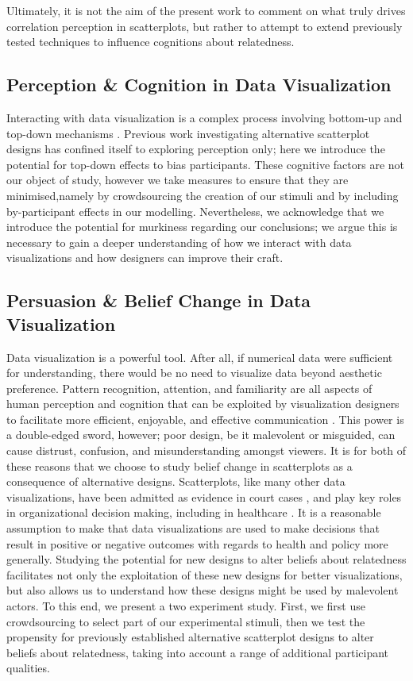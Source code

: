 \documentclass[manuscript,screen,review]{acmart}
\begin{document}
Ultimately, it is not the aim of the present work to comment on what
truly drives correlation perception in scatterplots, but rather to
attempt to extend previously tested techniques to influence cognitions
about relatedness.

\subsection{Perception \& Cognition in Data
Visualization}\label{sec-perception-cognition}

Interacting with data visualization is a complex process involving
bottom-up and top-down mechanisms
\citep{shah_2011, franconeri_2021, xiong_2022}. Previous work
investigating alternative scatterplot designs has confined itself to
exploring perception only; here we introduce the potential for top-down
effects to bias participants. These cognitive factors are not our object
of study, however we take measures to ensure that they are
minimised,namely by crowdsourcing the creation of our stimuli and by
including by-participant effects in our modelling. Nevertheless, we
acknowledge that we introduce the potential for murkiness regarding our
conclusions; we argue this is necessary to gain a deeper understanding
of how we interact with data visualizations and how designers can
improve their craft.

\subsection{Persuasion \& Belief Change in Data
Visualization}\label{sec-persuasion}

Data visualization is a powerful tool. After all, if numerical data were
sufficient for understanding, there would be no need to visualize data
beyond aesthetic preference. Pattern recognition, attention, and
familiarity are all aspects of human perception and cognition that can
be exploited by visualization designers to facilitate more efficient,
enjoyable, and effective communication \citep{franconeri_2021}. This
power is a double-edged sword, however; poor design, be it malevolent or
misguided, can cause distrust, confusion, and misunderstanding amongst
viewers. It is for both of these reasons that we choose to study belief
change in scatterplots as a consequence of alternative designs.
Scatterplots, like many other data visualizations, have been admitted as
evidence in court cases \citep{bobko_1979}, and play key roles in
organizational decision making, including in healthcare
\citep{wang_2021}. It is a reasonable assumption to make that data
visualizations are used to make decisions that result in positive or
negative outcomes with regards to health and policy more generally.
Studying the potential for new designs to alter beliefs about
relatedness facilitates not only the exploitation of these new designs
for better visualizations, but also allows us to understand how these
designs might be used by malevolent actors. To this end, we present a
two experiment study. First, we first use crowdsourcing to select part
of our experimental stimuli, then we test the propensity for previously
established alternative scatterplot designs to alter beliefs about
relatedness, taking into account a range of additional participant
qualities.
\end{document}

